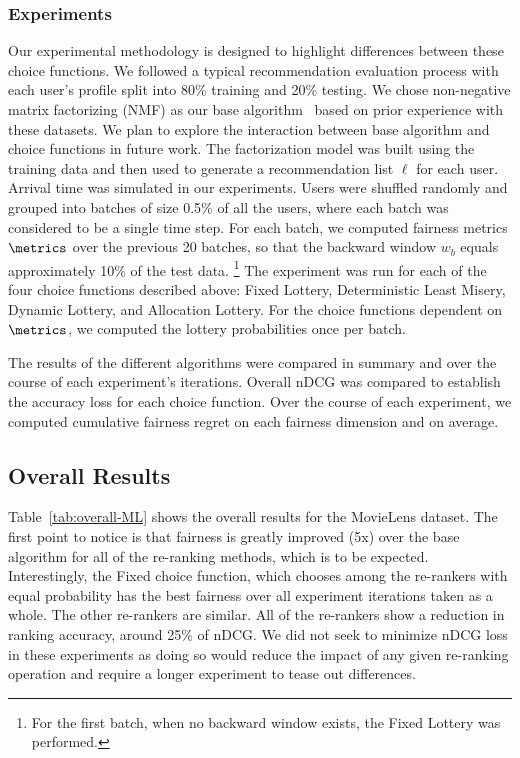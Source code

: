 \subsubsection{Experiments}
Our experimental methodology is designed to highlight differences between these choice functions. We followed a typical recommendation evaluation process with each user's profile split into 80\% training and 20\% testing. We chose non-negative matrix factorizing (NMF) as our base algorithm~\cite{takacs2008investigation} based on prior experience with these datasets. We plan to explore the interaction between base algorithm and choice functions in future work. The factorization model was built using the training data and then used to generate a recommendation list $\ell$ for each user.
Arrival time was simulated in our experiments. Users were shuffled randomly and grouped into batches of size 0.5\% of all the users, where each batch was considered to be a single time step. For each batch, we computed fairness metrics $\metrics$ over the previous 20 batches, so that the backward window $w_b$ equals approximately 10\% of the test data. \footnote{For the first batch, when no backward window exists, the Fixed Lottery was performed.} The experiment was run for each of the four choice functions described above: Fixed Lottery, Deterministic Least Misery, Dynamic Lottery, and Allocation Lottery. For the choice functions dependent on $\metrics$, we computed the lottery probabilities once per batch. 

The results of the different algorithms were compared in summary and over the course of each experiment's iterations. Overall nDCG was compared to establish the accuracy loss for each choice function. Over the course of each experiment, we computed cumulative fairness regret on each fairness dimension and on average. 

\subsection{Overall Results}

Table~\ref{tab:overall-ML} shows the overall results for the MovieLens dataset. The first point to notice is that fairness is greatly improved (5x) over the base algorithm for all of the re-ranking methods, which is to be expected. Interestingly, the Fixed choice function, which chooses among the re-rankers with equal probability has the best fairness over all experiment iterations taken as a whole. The other re-rankers are similar. All of the re-rankers show a reduction in ranking accuracy, around 25\% of nDCG. We did not seek to minimize nDCG loss in these experiments as doing so would reduce the impact of any given re-ranking operation and require a longer experiment to tease out differences.

